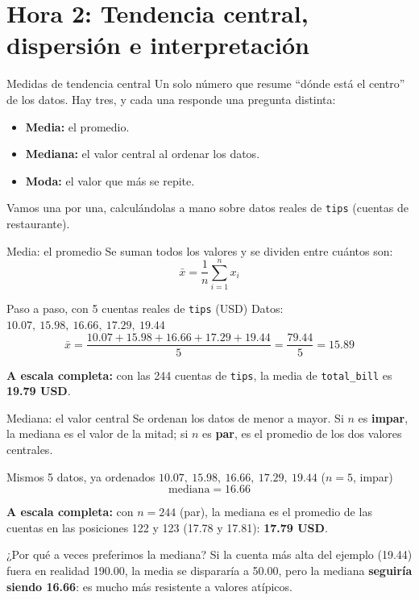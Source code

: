 \documentclass[aspectratio=169,11pt]{beamer}
\begin{document}
\section{Hora 2: Tendencia central, dispersión e interpretación}
\begin{frame}{Medidas de tendencia central}
  \small
  Un solo número que resume ``dónde está el centro'' de los datos. Hay
  tres, y cada una responde una pregunta distinta:
  \begin{itemize}
    \small
    \item \textbf{Media:} el promedio.
    \item \textbf{Mediana:} el valor central al ordenar los datos.
    \item \textbf{Moda:} el valor que más se repite.
  \end{itemize}
  \small Vamos una por una, calculándolas a mano sobre datos reales de
  \texttt{tips} (cuentas de restaurante).
\end{frame}

\begin{frame}{Media: el promedio}
  \small
  Se suman todos los valores y se dividen entre cuántos son:
  \[
    \bar{x} = \frac{1}{n}\sum_{i=1}^n x_i
  \]
  \begin{exampleblock}{\small Paso a paso, con 5 cuentas reales de \texttt{tips} (USD)}
    \small
    Datos: $10.07,\ 15.98,\ 16.66,\ 17.29,\ 19.44$
    \[
      \bar{x} = \frac{10.07+15.98+16.66+17.29+19.44}{5} = \frac{79.44}{5} = 15.89
    \]
  \end{exampleblock}
  \small \textbf{A escala completa:} con las 244 cuentas de \texttt{tips},
  la media de \texttt{total\_bill} es \textbf{19.79 USD}.
\end{frame}

\begin{frame}{Mediana: el valor central}
  \small
  Se ordenan los datos de menor a mayor. Si $n$ es \textbf{impar}, la
  mediana es el valor de la mitad; si $n$ es \textbf{par}, es el promedio
  de los dos valores centrales.
  \begin{exampleblock}{\small Mismos 5 datos, ya ordenados}
    \small
    $10.07,\ 15.98,\ \mathbf{16.66},\ 17.29,\ 19.44$ \quad ($n=5$, impar)
    \[
      \text{mediana} = 16.66
    \]
  \end{exampleblock}
  \small \textbf{A escala completa:} con $n=244$ (par), la mediana es el
  promedio de las cuentas en las posiciones 122 y 123 (17.78 y 17.81):
  \textbf{17.79 USD}.
  \begin{alertblock}{¿Por qué a veces preferimos la mediana?}
    \small Si la cuenta más alta del ejemplo (19.44) fuera en realidad
    190.00, la media se dispararía a 50.00, pero la mediana \textbf{seguiría
    siendo 16.66}: es mucho más resistente a valores atípicos.
  \end{alertblock}
\end{frame}
\end{document}
